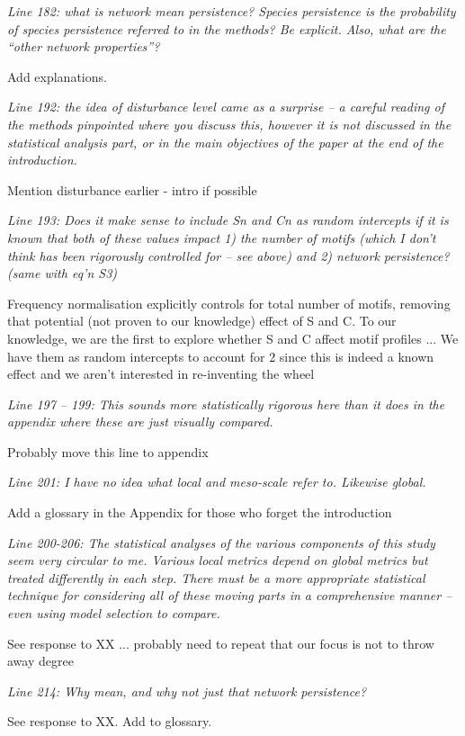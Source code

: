 \documentclass[12pt]{article}
\newcommand{\us}{\rm \setlength{\leftskip}{0.3cm} \setlength{\rightskip}{0.3cm}}
\newcommand{\them}{\it \setlength{\leftskip}{0cm} \setlength{\rightskip}{0cm}}
\begin{document}
\them
Line 182: what is network mean persistence? Species persistence is the probability of species persistence referred to in the methods? Be explicit. Also, what are the “other network properties”?

\us
Add explanations.

\them
Line 192: the idea of disturbance level came as a surprise – a careful reading of the methods pinpointed where you discuss this, however it is not discussed in the statistical analysis part, or in the main objectives of the paper at the end of the introduction.

\us Mention disturbance earlier - intro if possible

\them
Line 193: Does it make sense to include Sn and Cn as random intercepts if it is known that both of these values impact 1) the number of motifs (which I don’t think has been rigorously controlled for – see above) and 2) network persistence? (same with eq’n S3)

\us Frequency normalisation explicitly controls for total number of motifs, removing that potential (not proven to our knowledge) effect of S and C. To our knowledge, we are the first to explore whether S and C affect motif profiles ... 
We have them as random intercepts to account for 2 since this is indeed a known effect and we aren't interested in re-inventing the wheel

\them
Line 197 – 199: This sounds more statistically rigorous here than it does in the appendix where these are just visually compared.

\us Probably move this line to appendix

\them
Line 201: I have no idea what local and meso-scale refer to. Likewise global.

\us Add a glossary in the Appendix for those who forget the introduction

\them
Line 200-206: The statistical analyses of the various components of this study seem very circular to me. Various local metrics depend on global metrics but treated differently in each step. There must be a more appropriate statistical technique for considering all of these moving parts in a comprehensive manner – even using model selection to compare.

\us See response to XX ... probably need to repeat that our focus is not to throw away degree

\them
Line 214: Why mean, and why not just that network persistence?

\us See response to XX. Add to glossary.
\end{document}
